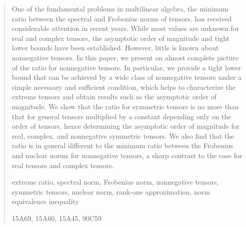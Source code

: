 \documentclass[11pt]{article}
\begin{document}
\begin{abstract}

One of the fundamental problems in multilinear algebra, the minimum ratio between the spectral and Frobenius norms of tensors, has received considerable attention in recent years. While most values are unknown for real and complex tensors, the asymptotic order of magnitude and tight lower bounds have been established. However, little is known about nonnegative tensors. In this paper, we present an almost complete picture of the ratio for nonnegative tensors. In particular, we provide a tight lower bound that can be achieved by a wide class of nonnegative tensors under a simple necessary and sufficient condition, which helps to characterize the extreme tensors and obtain results such as the asymptotic order of magnitude. We show that the ratio for symmetric tensors is no more than that for general tensors multiplied by a constant depending only on the order of tensors, hence determining the asymptotic order of magnitude for real, complex, and nonnegative symmetric tensors. We also find that the ratio is in general different to the minimum ratio between the Frobenius and nuclear norms for nonnegative tensors, a sharp contrast to the case for real tensors and complex tensors.

\vspace{0.25cm}

extreme ratio,
spectral norm,
Frobenius norm,
nonnegative tensors,
symmetric tensors,
nuclear norm,
rank-one approximation,
norm equivalence inequality

\vspace{0.25cm}

15A69, %
15A60, %
15A45, %
90C59  %

%

\end{abstract}
\end{document}
